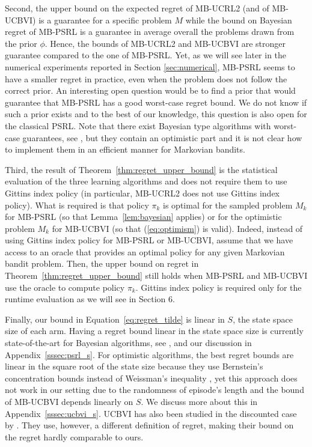 Second, the upper bound on the expected regret of MB-UCRL2 (and of MB-UCBVI) is a guarantee for a specific problem $M$ while the bound on Bayesian regret of MB-PSRL is a guarantee in average overall the problems drawn from the prior $\phi$. Hence, the bounds of MB-UCRL2 and MB-UCBVI are stronger guarantee compared to the one of MB-PSRL.  Yet, as we will see later in the numerical experiments reported in Section \ref{sec:numerical}, MB-PSRL seems to have a smaller regret in practice, even when the problem does not follow the correct prior.
An interesting open question would be to find a prior that would guarantee that MB-PSRL has a good worst-case regret bound. We do not know if such a prior exists and to the best of our knowledge, this question is also open for the classical PSRL. Note that there exist Bayesian type algorithms with worst-case guarantees, see \eg, \cite{ishfaq2021randomized,agrawal2021improved,wang2020reinforcement,agrawal2017posterior} but they contain an optimistic part and it is not clear how to implement them in an efficient manner for Markovian bandits.

Third, the result of Theorem~\ref{thm:regret_upper_bound} is the statistical evaluation of the three learning algorithms and does not require them to use Gittins index policy (in particular, MB-UCRL2 does not use Gittins index policy).
What is required is that policy $\pi_k$ is optimal for the sampled problem $M_k$ for MB-PSRL (so that Lemma~\ref{lem:bayesian} applies) or for the optimistic problem $M_k$ for MB-UCBVI (so that (\ref{eq:optimism}) is valid).
Indeed, instead of using Gittins index policy for MB-PSRL or MB-UCBVI, assume that we have access to an oracle that provides an optimal policy for any given Markovian bandit problem.
Then, the upper bound on regret in Theorem~\ref{thm:regret_upper_bound} still holds when MB-PSRL and MB-UCBVI use the oracle to compute policy $\pi_k$.
Gittins index policy is required only for the runtime evaluation as we will see in Section 6.

Finally, our bound in Equation~\eqref{eq:regret_tilde} is linear in $S$, the state space size of each arm. Having a regret bound linear in the state space size is currently state-of-the-art for Bayesian algorithms, see \eg, \cite{agrawal2017posterior,ouyang2017learning} and our discussion in Appendix~\ref{sssec:psrl_s}. For optimistic algorithms, the best regret bounds are linear in the square root of the state size because they use  Bernstein's concentration bounds instead of Weissman's inequality \cite{azar2017minimax}, yet this approach does not work in our setting due to the randomness of episode's length and the bound of MB-UCBVI depends linearly on $S$. We discuss more about this in Appendix~\ref{sssec:ucbvi_s}. UCBVI has also been studied in the discounted case by \cite{zhou2021nearly}. They use, however, a different definition of regret, making their bound on the regret hardly comparable to ours.

